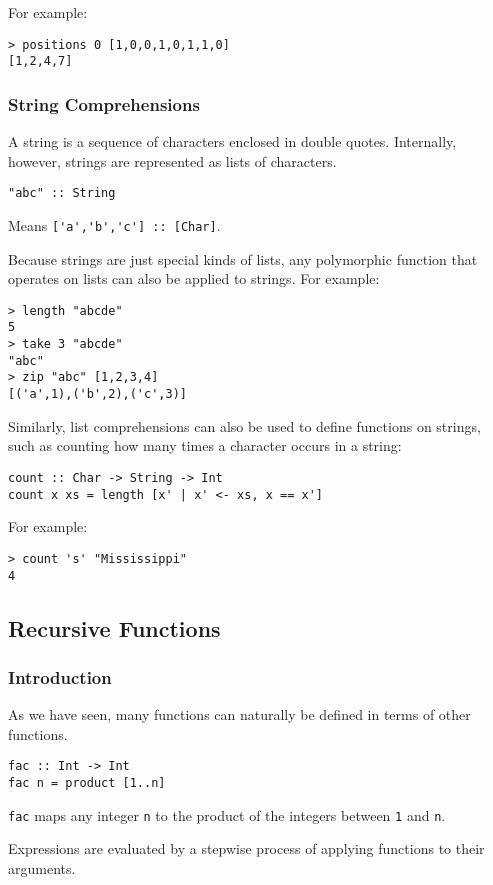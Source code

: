 \begin{multicols}{2}
For example:
\begin{lstlisting}
> positions 0 [1,0,0,1,0,1,1,0]
[1,2,4,7]
\end{lstlisting}

\subsubsection{String Comprehensions}
A string is a sequence of characters enclosed in double quotes.
Internally, however, strings are represented as lists of characters.
\begin{lstlisting}
"abc" :: String
\end{lstlisting}
Means \lstinline{['a','b','c'] :: [Char]}.

Because strings are just special kinds of lists, any polymorphic function that operates on lists can also be applied to strings.
For example:
\begin{lstlisting}
> length "abcde"
5
> take 3 "abcde"
"abc"
> zip "abc" [1,2,3,4]
[('a',1),('b',2),('c',3)]
\end{lstlisting}

Similarly, list comprehensions can also be used to define functions on strings, such as counting how many times a character occurs in a string:
\begin{lstlisting}
count :: Char -> String -> Int
count x xs = length [x' | x' <- xs, x == x']
\end{lstlisting}

For example:
\begin{lstlisting}
> count 's' "Mississippi"
4
\end{lstlisting}

\subsection{Recursive Functions}
\subsubsection{Introduction}
As we have seen, many functions can naturally be defined in terms of other functions.
\begin{lstlisting}
fac :: Int -> Int
fac n = product [1..n]
\end{lstlisting}
\lstinline{fac} maps any integer \lstinline{n} to the product of the integers between \lstinline{1} and \lstinline{n}.

Expressions are evaluated by a stepwise process of applying functions to their arguments.


\end{multicols}
